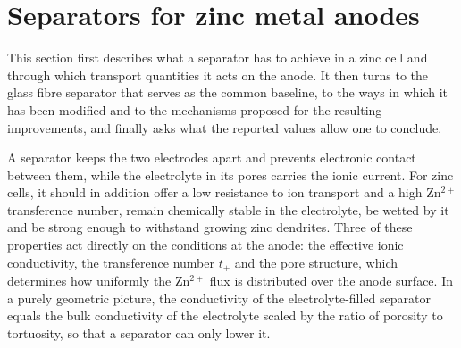 
\section{Separators for zinc metal anodes}
\label{sec:separators}

This section first describes what a separator has to achieve in a zinc cell and through which transport quantities it acts on the anode.
It then turns to the glass fibre separator that serves as the common baseline, to the ways in which it has been modified and to the mechanisms proposed for the resulting improvements, and finally asks what the reported values allow one to conclude.

A separator keeps the two electrodes apart and prevents electronic contact between them, while the electrolyte in its pores carries the ionic current\cite{gu_role_2025}.
For zinc cells, it should in addition offer a low resistance to ion transport and a high Zn$^{2+}$ transference number, remain chemically stable in the electrolyte, be wetted by it and be strong enough to withstand growing zinc dendrites\cite{gu_role_2025}.
Three of these properties act directly on the conditions at the anode: the effective ionic conductivity, the transference number $t_+$ and the pore structure, which determines how uniformly the Zn$^{2+}$ flux is distributed over the anode surface\cite{gu_role_2025}.
In a purely geometric picture, the conductivity of the electrolyte-filled separator equals the bulk conductivity of the electrolyte scaled by the ratio of porosity to tortuosity\cite{zahn_improving_2016}, so that a separator can only lower it.

